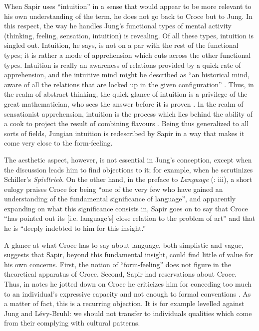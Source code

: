 \documentclass[output=paper]{langscibook}
\begin{document}
When Sapir uses ``intuition'' in a sense that would appear to be more relevant to his own understanding of the term, he does not go back to Croce but to Jung. In this respect, the way he handles Jung's functional types of mental activity (thinking, feeling, sensation, intuition) is revealing. Of all these types, intuition is singled out. Intuition, he says, is not on a par with the rest of the functional types; it is rather a mode of apprehension which cuts across the other functional types. Intuition is really an awareness of relations provided by a quick rate of apprehension, and the intuitive mind might be described as ``an historical mind, aware of all the relations that are locked up in the given configuration'' \citep[167]{Sapir2002}. Thus, in the realm of abstract thinking, the quick glance of intuition is a privilege of the great mathematician, who sees the answer before it is proven \citep[167]{Sapir2002}. In the realm of sensationist apprehension, intuition is the process which lies behind the ability of a cook to project the result of combining flavours \citep[168]{Sapir2002}. Being thus generalized to all sorts of fields, Jungian intuition is redescribed by Sapir in a way that makes it come very close to the form-feeling.

The aesthetic aspect, however, is not essential in Jung's conception, except when the discussion leads him to find objections to it; for example, when he scrutinizes Schiller's \emph{Spieltrieb}. On the other hand, in the preface to \emph{Language} (\citeyear{Sapir1921}: iii), a short eulogy praises Croce for being ``one of the very few who have gained an understanding of the fundamental significance of language'', and apparently expanding on what this significance consists in, Sapir goes on to say that Croce ``has pointed out its [i.e. language's] close relation to the problem of art'' and that he is ``deeply indebted to him for this insight.''

A glance at what Croce has to say about language, both simplistic and vague, suggests that Sapir, beyond this fundamental insight, could find little of value for his own concerns. First, the notion of ``form-feeling'' does not figure in the theoretical apparatus of Croce. Second, Sapir had reservations about Croce. Thus, in notes he jotted down on Croce he criticizes him for conceding too much to an individual's expressive capacity and not enough to formal conventions \citep{Handler1986}. As a matter of fact, this is a recurring objection. It is for example levelled against Jung and Lévy-Bruhl: we should not transfer to individuals qualities which come from their complying with cultural patterns.
\end{document}
